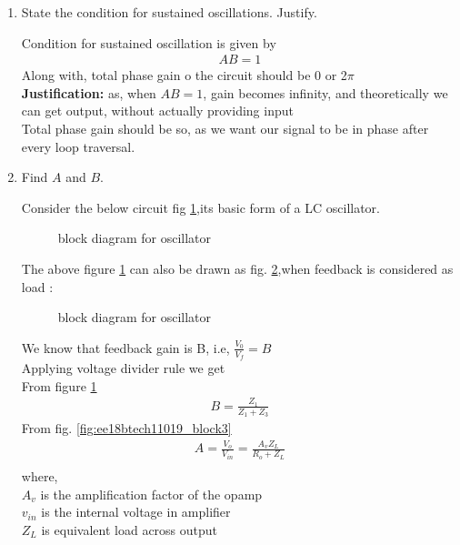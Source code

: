 \begin{enumerate}[label=\thesection.\arabic*.,ref=\thesection.\theenumi]
\item State the condition for sustained oscillations. Justify.

\solution Condition for sustained oscillation is given by\\
\begin{align}
    AB = 1
\end{align}
Along with, total phase gain o the circuit should be 0 or 2$\pi$\\
\textbf{Justification:} as, when $ AB =1 $, gain becomes infinity, and theoretically we can get output, without actually providing input\\
Total phase gain should be so, as we want our signal to be in phase after every loop traversal.\\


\item Find $A$ and $B$.

\solution Consider the below circuit fig \ref{fig:ee18btech11019_block2},its basic form of a LC oscillator.\\
\begin{figure}[!ht]
    \begin{center}
		\resizebox{\columnwidth}{!}{}
		
	\end{center}
\caption{block diagram for oscillator}
\label{fig:ee18btech11019_block2}
\end{figure}
The above figure \ref{fig:ee18btech11019_block2} can also be drawn as fig. \ref{fig:ee18btech11019_block3},when feedback is considered as load :\\
\begin{figure}[!ht]
    \begin{center}
		\resizebox{\columnwidth}{!}{}
		
	\end{center}
\caption{block diagram for oscillator}
\label{fig:ee18btech11019_block3}
\end{figure}
We know that feedback gain is B, i.e, $\frac{V_0}{V_f} = B$\\
Applying voltage divider rule we get\\
From figure \ref{fig:ee18btech11019_block2}
\begin{align}
    B = \frac{Z_1}{Z_1 + Z_3}
\end{align}
From fig. \eqref{fig:ee18btech11019_block3}
\begin{align}
    A = \frac{V_o}{V_{in}} = \frac{A_vZ_L}{R_o + Z_L}\\
\end{align}    
    where,\\
    $A_v$ is the amplification factor of the opamp\\
    $v_{in}$ is the internal voltage in amplifier\\
    $Z_L$ is equivalent load across output
         

\end{enumerate}
